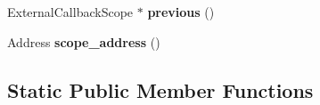 \begin{DoxyCompactItemize}
\item 
\hypertarget{classv8_1_1internal_1_1_b_a_s_e___e_m_b_e_d_d_e_d_a8f27d89bd1a04e88c0ad56d974857f4f}{}External\+Callback\+Scope $\ast$ {\bfseries previous} ()\label{classv8_1_1internal_1_1_b_a_s_e___e_m_b_e_d_d_e_d_a8f27d89bd1a04e88c0ad56d974857f4f}

\item 
\hypertarget{classv8_1_1internal_1_1_b_a_s_e___e_m_b_e_d_d_e_d_ab58c01f59c50f64a8f5503de1d07640f}{}Address {\bfseries scope\+\_\+address} ()\label{classv8_1_1internal_1_1_b_a_s_e___e_m_b_e_d_d_e_d_ab58c01f59c50f64a8f5503de1d07640f}

\end{DoxyCompactItemize}
\subsection*{Static Public Member Functions}
